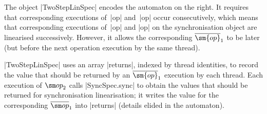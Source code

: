 
The object |TwoStepLinSpec| encodes the automaton on the right.  It requires
that corresponding executions of~|op| and~|op| occur consecutively,
which means that corresponding executions of~|op| and |op| on the
synchronisation object are linearised successively.  However, it
allows the corresponding $\overline{\sm{op}}_1$ to be later (but before the
next operation execution by the same thread).  
\end{window}

|TwoStepLinSpec| uses an array |returns|, indexed by thread identities, to
record the value that should be returned by an $\overline{\sm{op}}_1$
execution by each thread.  Each execution of $\op_2$ calls |SyncSpec.sync| to
obtain the values that should be returned for synchronisation linearisation;
it writes the value for the corresponding $\overline\op_1$ into |returns|
(details elided in the automaton).


